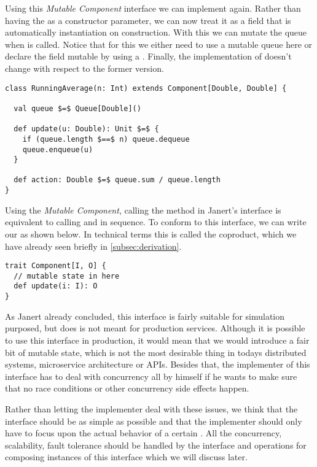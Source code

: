 Using this \textit{Mutable Component} interface we can implement  again. Rather than having the  as a constructor parameter, we can now treat it as a field that is automatically instantiation on construction. With this we can mutate the queue when  is called. Notice that for this we either need to use a mutable queue here or declare the field mutable by using a . Finally, the implementation of  doesn't change with respect to the former version.

\begin{lstlisting}[style=ScalaStyle]
class RunningAverage(n: Int) extends Component[Double, Double] {

  val queue $=$ Queue[Double]()

  def update(u: Double): Unit $=$ {
    if (queue.length $==$ n) queue.dequeue
    queue.enqueue(u)
  }

  def action: Double $=$ queue.sum / queue.length
}
\end{lstlisting}

Using the \textit{Mutable Component}, calling the  method in Janert's \comp interface is equivalent to calling  and  in sequence. To conform to this interface, we can write our \comp as shown below. In technical terms this is called the coproduct, which we have already seen briefly in \cref{subsec:derivation}.

\begin{lstlisting}[style=InlineScalaStyle]
trait Component[I, O] {
  // mutable state in here
  def update(i: I): O
}
\end{lstlisting}

As Janert already concluded, this interface is fairly suitable for simulation purposed, but does is not meant for production services. Although it is possible to use this interface in production, it would mean that we would introduce a fair bit of mutable state, which is not the most desirable thing in todays distributed systems, microservice architecture or APIs. Besides that, the implementer of this \comp interface has to deal with concurrency all by himself if he wants to make sure that no race conditions or other concurrency side effects happen.

Rather than letting the implementer deal with these issues, we think that the interface should be as simple as possible and that the implementer should only have to focus upon the actual behavior of a certain \comp. All the concurrency, scalability, fault tolerance should be handled by the interface and operations for composing instances of this interface which we will discuss later.

